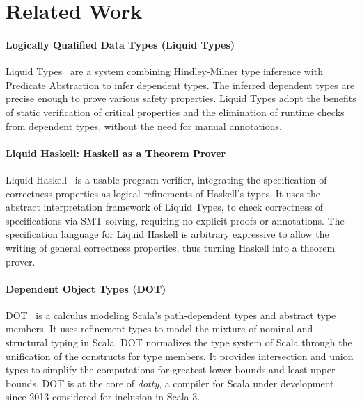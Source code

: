 \chapter{Related Work}
\label{chp:related}

\begin{minipage}{0.9\textwidth}
\subsubsection{Logically Qualified Data Types (Liquid Types)}
Liquid Types~\cite{liquid-types} are a system
combining Hindley-Milner type inference with Predicate Abstraction
to infer dependent types.
The inferred dependent types are precise enough
to prove various safety properties.
Liquid Types adopt the benefits of
static verification of critical properties and
the elimination of runtime checks
from dependent types,
without the need for manual annotations.
\\
\subsubsection{Liquid Haskell: Haskell as a Theorem Prover}
Liquid Haskell~\cite{liquid-haskell} is a usable
program verifier, integrating
the specification of correctness properties
as logical refinements of Haskell's types.
It uses the abstract interpretation framework of Liquid Types,
to check correctness of specifications via SMT solving,
requiring no explicit proofs or annotations.
The specification language for Liquid Haskell
is arbitrary expressive to allow
the writing of general correctness properties,
thus turning Haskell into a theorem prover.
\\
\subsubsection{Dependent Object Types (DOT)}
DOT~\cite{dot1,dot2} is a calculus
modeling Scala's path-dependent types and abstract type members.
It uses refinement types to model the mixture of
nominal and structural typing in Scala.
DOT normalizes the type system of Scala
through the unification of the constructs for type members.
It provides intersection and union types
to simplify the computations for greatest lower-bounds
and least upper-bounds.
DOT is at the core of \textit{dotty},
a compiler for Scala under development since 2013
considered for inclusion in Scala 3.
\end{minipage}

